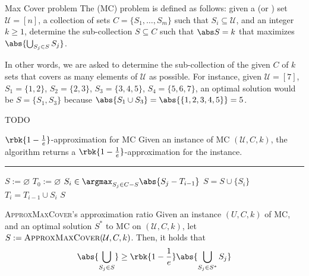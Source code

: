 \documentclass[a4paper, 12pt]{report}
\begin{document}
    \begin{frameddefn}{Max Cover problem}
        The  (MC) problem is defined as follows: given a  (or ) set $\mathcal U = [n]$, a collection of sets $C = \{S_1, \ldots, S_m \}$ such that $S_i \subseteq \mathcal U$, and an integer $k \ge 1$, determine the sub-collection $S \subseteq C$ such that $\abs S = k$ that maximizes $\abs{\bigcup_{S_j \in S}{S_j}}$.
    \end{frameddefn}

    In other words, we are asked to determine the sub-collection of the given $C$ of $k$ sets that covers as many elements of $\mathcal U$ as possible. For instance, given $\mathcal U = [7]$, $S_1 = \{1, 2\}$, $S_2 = \{2, 3\}$, $S_3 = \{3, 4, 5\}$, $S_4 = \{5, 6, 7\}$, an optimal solution would be $S = \{S_1, S_3\}$ because $\abs{S_1 \cup S_3} = \abs{\{1, 2, 3, 4, 5\}} = 5$.

    TODO 

    \begin{framedalgo}{$\rbk{1 - \frac{1}{e}}$-approximation for MC}
        Given an instance of MC $(\mathcal U, C, k)$, the algorithm returns a $\rbk{1 - \tfrac{1}{e}}$-approximation for the instance. \\
        \hrule

        \quad
        \begin{algorithmic}[1]
                \State $S := \varnothing$
                \State $T_0 := \varnothing$
                    \State $\displaystyle S_i \in \argmax_{S_j \in C - S}{\abs{S_j - T_{i - 1}}}$ 
                    \State $S = S \cup \{S_i\}$
                    \State $T_i = T_{i - 1} \cup S_i$
                \EndFor
                \State {} $S$
            \EndFunction
        \end{algorithmic}
    \end{framedalgo}

    \begin{framedthm}{\textsc{ApproxMaxCover}'s approximation ratio}
        Given an instance $(U, C, k)$ of MC, and an optimal solution $S^*$ to MC on $(\mathcal U, C, k)$, let $S := \textsc{ApproxMaxCover}(\mathcal U, C, k)$. Then, it holds that $$\abs{\bigcup_{S_j \in S}} \ge \rbk{1 - \dfrac{1}{e}}\abs{\bigcup_{S_j \in S^*}{S_j}}$$
    \end{framedthm}
\end{document}
